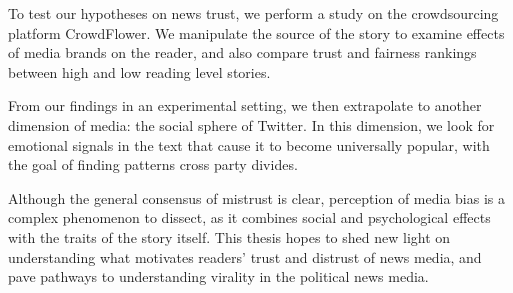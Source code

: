 To test our hypotheses on news trust, we perform a study on the crowdsourcing platform CrowdFlower. We manipulate the source of the story to examine effects of media brands on the reader, and also compare trust and fairness rankings between high and low reading level stories.


From our findings in an experimental setting, we then extrapolate to another dimension of media: the social sphere of Twitter. In this dimension, we look for emotional signals in the text that cause it to become universally popular, with the goal of finding patterns cross party divides.

Although the general consensus of mistrust is clear, perception of media bias is a complex phenomenon to dissect, as it combines social and psychological effects with the traits of the story itself. This thesis hopes to shed new light on understanding what motivates readers' trust and distrust of news media, and pave pathways to understanding virality in the political news media. 
 